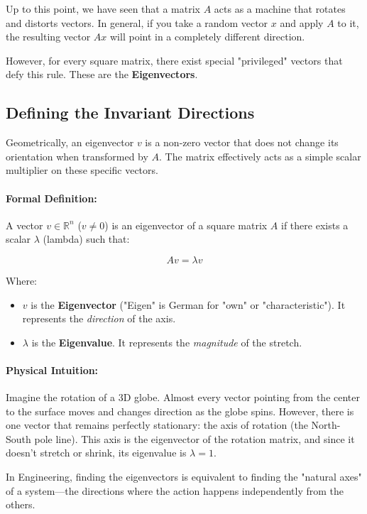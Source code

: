 Up to this point, we have seen that a matrix $A$ acts as a machine that rotates and distorts vectors. In general, if you take a random vector $x$ and apply $A$ to it, the resulting vector $Ax$ will point in a completely different direction.

However, for every square matrix, there exist special "privileged" vectors that defy this rule. These are the \textbf{Eigenvectors}.

\subsection{Defining the Invariant Directions}

Geometrically, an eigenvector $v$ is a non-zero vector that does not change its orientation when transformed by $A$. The matrix effectively acts as a simple scalar multiplier on these specific vectors.
\paragraph{Formal Definition:}
A vector $v \in \mathbb{R}^n$ ($v \neq 0$) is an eigenvector of a square matrix $A$ if there exists a scalar $\lambda$ (lambda) such that:

\begin{equation}
Av = \lambda v
\end{equation}

Where:
\begin{itemize}
    \item $v$ is the \textbf{Eigenvector} ("Eigen" is German for "own" or "characteristic"). It represents the \textit{direction} of the axis.
    \item $\lambda$ is the \textbf{Eigenvalue}. It represents the \textit{magnitude} of the stretch.
\end{itemize}
\paragraph{Physical Intuition:}
Imagine the rotation of a 3D globe. Almost every vector pointing from the center to the surface moves and changes direction as the globe spins.
However, there is one vector that remains perfectly stationary: the axis of rotation (the North-South pole line). This axis is the eigenvector of the rotation matrix, and since it doesn't stretch or shrink, its eigenvalue is $\lambda = 1$.

In Engineering, finding the eigenvectors is equivalent to finding the "natural axes" of a system—the directions where the action happens independently from the others.


